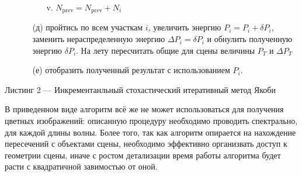 \documentclass[12pt]{article}
\begin{document}
\begin{framed}
\begin{enumerate}
\begin{enumerate}
\begin{enumerate}
\begin{enumerate}
        \end{enumerate}
        \item[v.] $N_{\text{prev}} = N_{\text{prev}} + N_i$
    \end{enumerate}
    \item[(д)] пройтись по всем участкам $i$, увеличить энергию $P_i = P_i + \delta P_i$, заменить нераспределенную энергию $\Delta P_i = \delta P_i$ и обнулить полученную энергию $\delta P_i$. На лету пересчитать общие для сцены величины $P_T$ и $\Delta P_T$
    \item[(е)] отобразить полученный результат с использованием $P_i$.
\end{enumerate}
\end{enumerate}
\end{framed}
\begin{center}
Листинг 2 --- Инкрементанльный стохастический итеративный метод Якоби 
\end{center}

В приведенном виде алгоритм всё же не может использоваться для получения цветных изображений: описанную процедуру необходимо проводить спектрально, для каждой длины волны. Более того, так как алгоритм опирается на нахождение пересечений с объектами сцены, необходимо эффективно организвать доступ к геометрии сцены, иначе с ростом детализации время работы алгоритма будет расти с квадратичной завимостью от оной.
\end{document}
